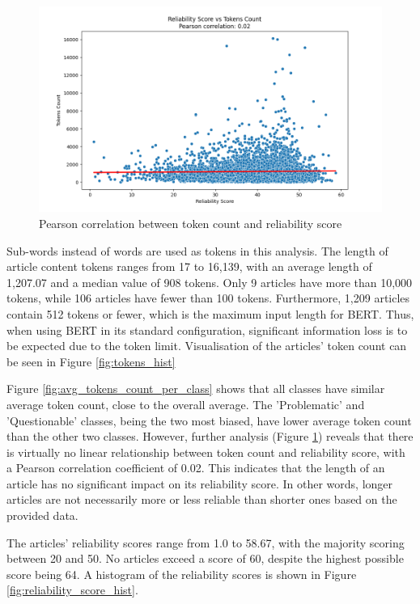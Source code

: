 \begin{figure}[htbp]
    \centering
    \includegraphics[width=0.9\linewidth]{figures/correlation_tokens_reliability_score.png}
    \caption{Pearson correlation between token count and reliability score}
    \label{fig:pearson_correlation}
\end{figure}

Sub-words instead of words are used as tokens in this analysis. The length of article content tokens ranges from 17 to 16,139, with an average length of 1,207.07 and a median value of 908 tokens. Only 9 articles have more than 10,000 tokens, while 106 articles have fewer than 100 tokens. Furthermore, 1,209 articles contain 512 tokens or fewer, which is the maximum input length for BERT. Thus, when using BERT in its standard configuration, significant information loss is to be expected due to the token limit. Visualisation of the articles' token count can be seen in Figure \ref{fig:tokens_hist}

Figure \ref{fig:avg_tokens_count_per_class} shows that all classes have similar average token count, close to the overall average. The 'Problematic' and 'Questionable' classes, being the two most biased, have lower average token count than the other two classes. However, further analysis (Figure \ref{fig:pearson_correlation}) reveals that there is virtually no linear relationship between token count and reliability score, with a Pearson correlation coefficient of 0.02. This indicates that the length of an article has no significant impact on its reliability score. In other words, longer articles are not necessarily more or less reliable than shorter ones based on the provided data.

The articles' reliability scores range from 1.0 to 58.67, with the majority scoring between 20 and 50. No articles  exceed a score of 60, despite the highest possible score being 64. A histogram of the reliability scores is shown in Figure \ref{fig:reliability_score_hist}.

